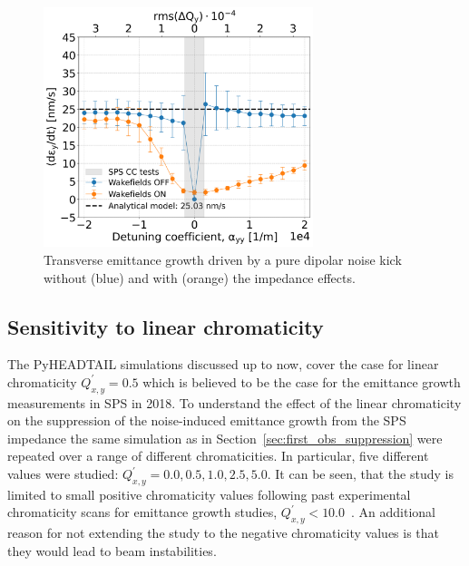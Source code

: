 \begin{figure}[!h] %
    \centering         
    \includegraphics[width=0.7\textwidth]{images/Ch7/deyRates_final_2018_dipolar_noise_sps_270GeV_DipoleNoiseSQRT1e-8_y-plane_QpxQpy5e-1_6D_Nb5e5_intensity3e10_ayyScan_wakesON_vs_OFF_vs_TuneSpreadvsExpectedSPS.png}
        \caption{Transverse emittance growth driven by a pure dipolar noise kick without (blue) and with (orange) the impedance effects.}
        \label{fig:study_5_dipole_noise}
 \end{figure}

\subsection{Sensitivity to linear chromaticity}\label{subsec:chroma_scan}
The PyHEADTAIL simulations discussed up to now, cover the case for linear chromaticity $Q^\prime_{x,y}=0.5$ which is believed to be the case for the emittance growth measurements in SPS in 2018. To understand the effect of the linear chromaticity on the suppression of the noise-induced emittance growth from the SPS impedance the same simulation as in Section~\ref{sec:first_obs_suppression} were repeated over a range of different chromaticities. In particular, five different values were studied: $Q^\prime_{x,y}=0.0, 0.5, 1.0, 2.5, 5.0$. It can be seen, that the study is limited to small positive chromaticity values following past experimental chromaticity scans for emittance growth studies,  $Q^\prime_{x,y}< 10.0$~\cite{Antoniou:2649815, Calaga:1451286}. An additional reason for not extending the study to the negative chromaticity values is that they would lead to beam instabilities.

